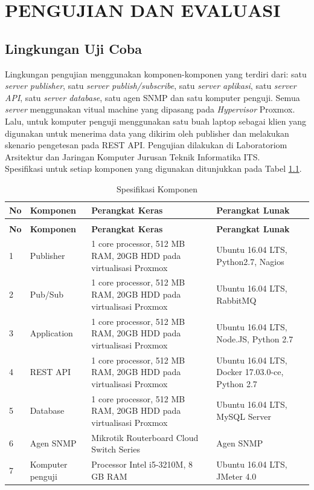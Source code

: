\chapter{PENGUJIAN DAN EVALUASI}

\section{Lingkungan Uji Coba}
	Lingkungan pengujian menggunakan komponen-komponen yang terdiri dari: satu \textit{server publisher}, satu \textit{server publish/subscribe}, satu \textit{server aplikasi}, satu \textit{server API}, satu \textit{server database}, satu agen SNMP dan satu komputer penguji. Semua \textit{server} menggunakan vitual machine yang dipasang pada \textit{Hypervisor} Proxmox. Lalu, untuk komputer penguji menggunakan satu buah laptop sebagai klien yang digunakan untuk menerima data yang dikirim oleh publisher dan melakukan skenario pengetesan pada REST API. Pengujian dilakukan di Laboratoriom Arsitektur dan Jaringan Komputer Jurusan Teknik Informatika ITS. \\
    \indent Spesifikasi untuk setiap komponen yang digunakan ditunjukkan pada Tabel \ref{spesifikasikomponen}.
    \begin{longtable}{|p{}|p{}|p{}|p{}|}					\caption{Spesifikasi Komponen} \label{spesifikasikomponen} \\
        \hline
        \textbf{No} & \textbf{Komponen} & \textbf{Perangkat Keras} & \textbf{Perangkat Lunak} \\ \hline
        \endfirsthead
        \caption[]{Spesifikasi Komponen} \\
        \hline
        \textbf{No} & \textbf{Komponen} & \textbf{Perangkat Keras} & \textbf{Perangkat Lunak} \\ \hline
        \endhead
        \endfoot
        \endlastfoot

    	1 & Publisher & 1 core processor, 512 MB RAM, 20GB HDD pada virtualisasi Proxmox & Ubuntu 16.04 LTS, Python2.7, Nagios \\ \hline
        2 & Pub/Sub & 1 core processor, 512 MB RAM, 20GB HDD pada virtualisasi Proxmox & Ubuntu 16.04 LTS, RabbitMQ \\ \hline
        3 & Application & 1 core processor, 512 MB RAM, 20GB HDD pada virtualisasi Proxmox & Ubuntu 16.04 LTS, Node.JS, Python 2.7 \\ \hline
        4 & REST API & 1 core processor, 512 MB RAM, 20GB HDD pada virtualisasi Proxmox & Ubuntu 16.04 LTS, Docker 17.03.0-ce, Python 2.7 \\ \hline
        5 & Database & 1 core processor, 512 MB RAM, 20GB HDD pada virtualisasi Proxmox & Ubuntu 16.04 LTS, MySQL Server \\ \hline
        6 & Agen SNMP & Mikrotik Routerboard Cloud Switch Series & Agen SNMP \\ \hline
        7 & Komputer penguji & Processor Intel i5-3210M, 8 GB RAM & Ubuntu 16.04 LTS, JMeter 4.0 \\ \hline
    \end{longtable}
    

